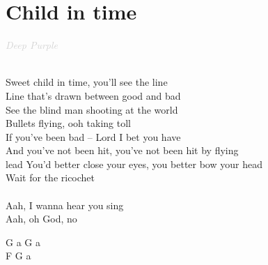 \documentclass[a5paper, 10pt]{book}
\begin{document}
\newpage
\section{Child in time}\textcolor{lightgray}{\textit{Deep Purple}}\\~\\
\begin{minipage}[t]{0.8\textwidth}
Sweet child in time, you'll see the line			\\
Line that's drawn between good and bad			\\
See the blind man shooting at the world\\
Bullets flying, ooh taking toll\\
If you've been bad – Lord I bet you have\\
And you've not been hit, you've not been hit by flying \\lead
You'd better close your eyes, you better bow your head\\
Wait for the ricochet\\
\\
\hspace*{5mm}Aah, I wanna hear you sing\\
\hspace*{5mm}Aah, oh God, no\\
\end{minipage}
\begin{minipage}[t]{0.2\textwidth}
G a G a\\
F G a \\
\end{minipage}

\newpage
\end{document}
